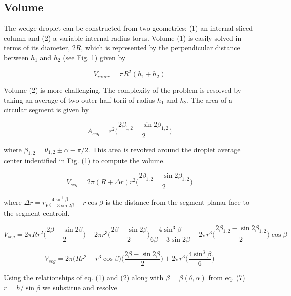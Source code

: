\documentclass{article}
\begin{document}
\subsection*{Volume} 

The wedge droplet can be constructed from two geometries: (1) an internal sliced column and (2) a variable internal radius torus. Volume (1) is easily solved in terms of its diameter, $2R$, which is represented by the perpendicular distance between $h_1$ and $h_2$ (see Fig. 1) given by

\begin{equation} 
V_{inner} = \pi R^2 (h_1 + h_2)
\end{equation}

Volume (2) is more challenging. The complexity of the problem is resolved by taking an average of two outer-half torii of radius $h_1$ and $h_2$. The area of a circular segment is given by

\begin{equation}A_{seg} = r^2 \Big( \frac{2\beta_{1,2} - \sin2 \beta_{1,2}}{2} \Big)
\end{equation}

where $\beta_{1,2} = \theta_{1,2} \pm \alpha - \pi/2$. This area is revolved around the droplet average center indentified in Fig. (1) to compute the volume.

\begin{equation} 
V_{seg} = 2\pi(R+\Delta r)r^2 \Big( \frac{2\beta_{1,2} - \sin2 \beta_{1,2}}{2} \Big) 
\end{equation}

where $\Delta r = r \frac{4\sin^3\beta}{6\beta - 3\sin2\beta} - r\cos\beta$ is the distance from the segment planar face to the segment centroid. 

\begin{equation}V_{seg} = 2\pi R r^2 \Big( \frac{2\beta - \sin2 \beta}{2} \Big) + 2\pi r^3 \Big( \frac{2\beta - \sin2 \beta}{2} \Big)\frac{4\sin^3\beta}{6\beta - 3\sin2\beta} - 2\pi r^3 \Big( \frac{2\beta_{1,2} - \sin2 \beta_{1,2}}{2} \Big)\cos\beta
\end{equation}

\begin{equation}
V_{seg} = 2\pi \Big(Rr^2 - r^3\cos\beta\Big)  \Big( \frac{2\beta - \sin2 \beta}{2} \Big) + 2\pi r^3 \Big( \frac{4\sin^3\beta}{6} \Big)
\end{equation}


Using the relationships of eq. (1) and (2) along with $\beta = \beta(\theta,\alpha)$ from eq. (7) $r = h/\sin\beta$ we substitue and resolve
\end{document}
